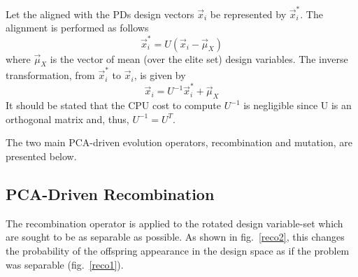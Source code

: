 Let the aligned with the PDs design vectors \(\vec{x}_i\) be represented by \(\vec{x}^*_i\). The alignment is performed as follows
\begin{equation} 
   \vec{x}^*_i=U(\vec{x}_i-\vec{\mu}_{X})
   \label{align} %
\end{equation}
where $\vec{\mu}_{X}$ is the vector of mean (over the elite set) design variables.
The inverse transformation, from $\vec{x}^*_i$ to $\vec{x}_i$, is given by
\begin{equation} 
   \vec{x}_i=U^{-1}\vec{x}^*_i+\vec{\mu}_{X}
	\label{re-align}
\end{equation}
It should be stated that the CPU cost to compute \(U^{-1}\) is negligible since U is an orthogonal matrix and, thus, \(U^{-1} = U^T\). 

The two main PCA-driven evolution operators, recombination and mutation, are presented below.  

\paragraph{}
\subsection{PCA-Driven Recombination}
The recombination operator is applied to the rotated design variable-set which are sought to be as separable as possible. As shown in fig.\ \ref{reco2}, this changes the probability of the offspring appearance in the design space as if the problem was separable (fig.\ \ref{reco1}). 

